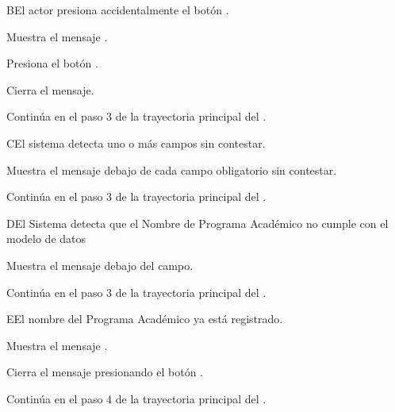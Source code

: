 
\begin{UCtrayectoriaA}{B}{El actor presiona accidentalmente el botón .}

    \UCpaso Muestra el mensaje .

    \UCpaso[\UCactor] Presiona el botón .

    \UCpaso Cierra el mensaje.

    \UCpaso Continúa en el paso 3 de la trayectoria principal del .

\end{UCtrayectoriaA}


\begin{UCtrayectoriaA}{C}{El sistema detecta uno o más campos sin contestar.}

    \UCpaso Muestra el mensaje  debajo de cada campo obligatorio sin contestar.

    \UCpaso Continúa en el paso 3 de la trayectoria principal del .

\end{UCtrayectoriaA}


\begin{UCtrayectoriaA}{D}{El Sistema detecta que el Nombre de Programa Académico no cumple con el modelo de datos}

    \UCpaso Muestra el mensaje  debajo del campo.

    \UCpaso Continúa en el paso 3 de la trayectoria principal del .

\end{UCtrayectoriaA}




\begin{UCtrayectoriaA}{E}{El nombre del Programa Académico ya está registrado.}

    \UCpaso Muestra el mensaje .

    \UCpaso[\UCactor] Cierra el mensaje presionando el botón .

    \UCpaso Continúa en el paso 4 de la trayectoria principal del .

\end{UCtrayectoriaA}

